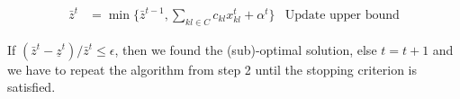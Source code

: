 \begin{tcolorbox}[colback=white!5!white,colframe=black!75!black,title=Benders' decomposition algorithm]
\begin{tcolorbox}[colback=red!5!white,colframe=red!75!black,title=\textbf{Step 3:} Slave problem solved by a classical solver]
    \begin{align}
    \bar{z}^{t} &=\min \{\bar{z}^{t-1}, \sum_{kl\in C}c_{kl}x_{kl}^{t} + \alpha^{t}\} & \text{Update upper bound}
    \end{align}
    \end{tcolorbox}
    \begin{tcolorbox}[colback=black!5!white,colframe=black!75!black,title=\textbf{Step 4:} Stopping criterion]
    If $\left(\bar{z}^{t} - \underline{z}^{t}\right)/\bar{z}^{t}\leq \epsilon$, then we found the (sub)-optimal solution, else $t=t+1$ and we have to repeat the algorithm from step 2 until the stopping criterion is satisfied.
    \end{tcolorbox}
\end{tcolorbox}

